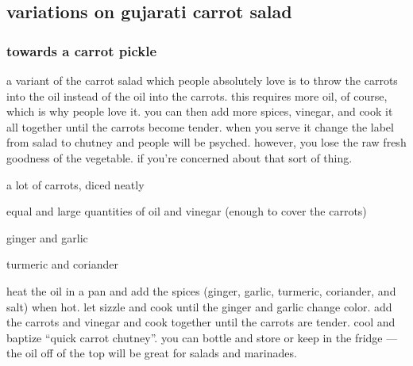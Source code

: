 \subsection{variations on gujarati carrot salad}

\subsubsection{towards a carrot pickle}

a variant of the carrot salad which people absolutely love is to throw the 
carrots into the oil instead of the oil into the carrots. this requires more 
oil, of course, which is why people love it. you can then add more spices, 
vinegar, and cook it all together until the carrots become tender. when you 
serve it change the label from salad to chutney and people will be psyched. 
however, you lose the raw fresh goodness of the vegetable. if you're concerned 
about that sort of thing.

\begin{ingredients}
  \item a lot of carrots, diced neatly
  \item equal and large quantities of oil and vinegar (enough to cover the carrots)
  \item ginger and garlic
  \item turmeric and coriander
\end{ingredients}

heat the oil in a pan and add the spices (ginger, garlic, turmeric, coriander, 
and salt) when hot. let sizzle and cook until the ginger and garlic change 
color. add the carrots and vinegar and cook together until the carrots are 
tender. cool and baptize ``quick carrot chutney''. you can bottle and store or 
keep in the fridge --- the oil off of the top will be great for salads and 
marinades.
